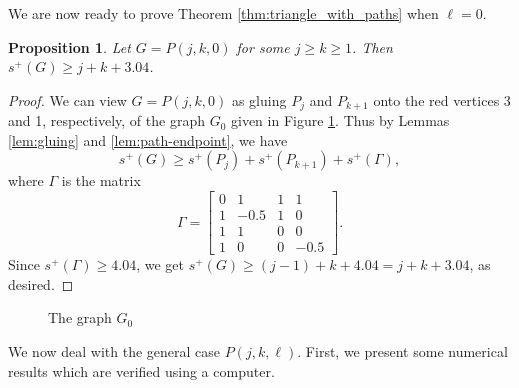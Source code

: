 \documentclass{article}
\newtheorem{proposition}{Proposition}[section]
\begin{document}
We are now ready to prove Theorem \ref{thm:triangle_with_paths} when $\ell=0$.

\begin{proposition}\label{prop:triangle_two_path}
   Let $G=P(j,k,0)$ for some $j\ge k\ge 1$. Then $s^+(G)\ge j+k+3.04$. 
\end{proposition}

\begin{proof} We can view $G = P(j, k, 0)$ as gluing $P_j$ and $P_{k+1}$ onto the red vertices 3 and 1, respectively, of the graph $G_0$ given in Figure \ref{fig:P(1,0,0)}. Thus by Lemmas \ref{lem:gluing} and \ref{lem:path-endpoint}, we have
\[s^+(G) \geq s^+(P_{j}) + s^+(P_{k+1}) + s^+(\Gamma),\]
where $\Gamma$ is the matrix
\[\Gamma = \begin{bmatrix}
    0 & 1 & 1 & 1 \\
    1 & -0.5 & 1 & 0 \\
    1 & 1 & 0 & 0 \\
    1 & 0 & 0 & -0.5
\end{bmatrix}.\]
Since $s^+(\Gamma) \geq 4.04$, we get $s^+(G) \geq (j - 1) + k + 4.04 =  j + k + 3.04$, as desired.
\end{proof}

\begin{figure}[H]
    \centering
{}
    \caption{The graph $G_0$}
    \label{fig:P(1,0,0)}
\end{figure}

We now deal with the general case $P(j,k,\ell)$. First, we present some numerical results which are verified using a computer.
\end{document}
